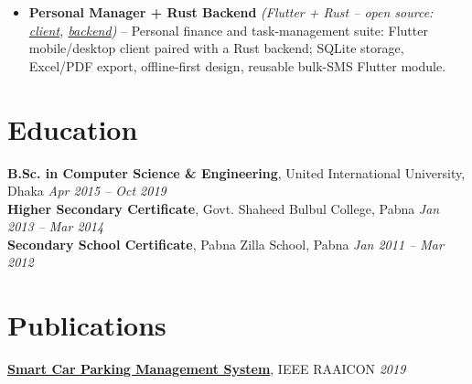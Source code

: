 \documentclass[a4paper,10pt]{article}
\begin{document}
\begin{itemize}[leftmargin=*, noitemsep, topsep=2pt, parsep=0pt, partopsep=0pt]
    \item \textbf{Personal Manager + Rust Backend} \textit{(Flutter + Rust -- open source: \href{https://github.com/Nahianether/personal_manager}{client}, \href{https://github.com/Nahianether/personal_manager_backend}{backend})} -- Personal finance and task-management suite: Flutter mobile/desktop client paired with a Rust backend; SQLite storage, Excel/PDF export, offline-first design, reusable bulk-SMS Flutter module.
\end{itemize}
\vspace{-3mm}

\section*{Education}
\vspace{-4mm}
\noindent\textbf{B.Sc. in Computer Science \& Engineering}, United International University, Dhaka \hfill \textit{Apr 2015 -- Oct 2019}\\
\noindent\textbf{Higher Secondary Certificate}, Govt. Shaheed Bulbul College, Pabna \hfill \textit{Jan 2013 -- Mar 2014}\\
\noindent\textbf{Secondary School Certificate}, Pabna Zilla School, Pabna \hfill \textit{Jan 2011 -- Mar 2012}
\vspace{-4mm}

\section*{Publications}
\vspace{-4mm}
\noindent\href{https://ieeexplore.ieee.org/abstract/document/9087513}{\textbf{Smart Car Parking Management System}}, IEEE RAAICON \hfill \textit{2019}
\end{document}
